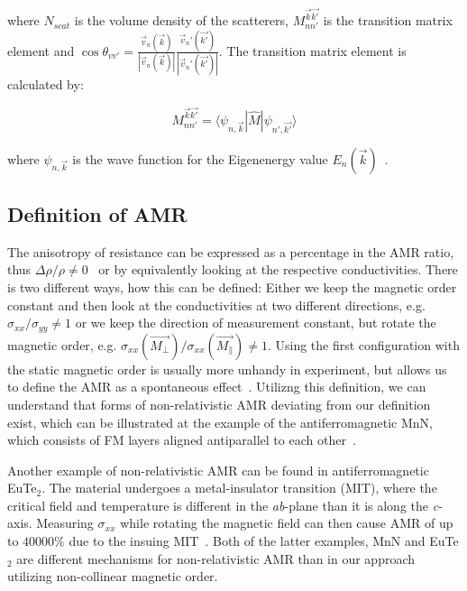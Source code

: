 \documentclass[prb,showpacs,amsmath,amssymb,superscriptaddress,twocolumn,floatfix]{revtex4-1}
\begin{document}
where $N_{scat}$ is the volume density of the scatterers, $M^{\vec{k}\vec{k'}}_{nn'}$ is the transition matrix element and $\cos \theta_{vv'} = \frac{\vec{v}_n (\vec{k})}{|\vec{v}_n (\vec{k})|}\frac{\vec{v}_n' (\vec{k'})}{|\vec{v}_n' (\vec{k'})|}$. The transition matrix element is calculated by:

\begin{equation}
	M^{\vec{k}\vec{k'}}_{nn'} = \langle \psi_{n, \vec{k}}|\hat{M}|\psi_{n', \vec{k'}} \rangle
	\label{eq_transmatrix}
\end{equation}

where $\psi_{n, \vec{k}}$ is the wave function for the Eigenenergy value $E_n(\vec{k})$~\cite{Vyborny:2009}. 

\subsection{Definition of AMR}

The anisotropy of resistance can be expressed as a percentage in the AMR ratio, thus $\Delta \rho / \rho \neq 0$~\cite{Ritzinger:2023} or by equivalently looking at the respective conductivities. There is two different ways, how this can be defined: Either we keep the magnetic order constant and then look at the conductivities at two different directions, e.g. $\sigma_{xx} / \sigma_{yy} \neq 1$ or we keep the direction of measurement constant, but rotate the magnetic order, e.g. $\sigma_{xx} (\vec{M_\perp})  / \sigma_{xx} (\vec{M_\parallel}) \neq 1$. Using the first configuration with the static magnetic order is usually more unhandy in experiment, but allows us to define the AMR as a spontaneous effect~\cite{Bakonyi:2022}. Utilizng this definition, we can understand that forms of non-relativistic AMR deviating from our definition exist, which can be illustrated at the example of the antiferromagnetic MnN, which consists of FM layers aligned antiparallel to each other~\cite{Dunz:2020}.

Another example of non-relativistic AMR can be found in antiferromagnetic EuTe$_2$. The material undergoes a metal-insulator transition (MIT), where the critical field and temperature is different in the \textit{ab}-plane than it is along the \textit{c}-axis. Measuring $\sigma_{xx}$ while rotating the magnetic field can then cause AMR of up to $40000\%$ due to the insuing MIT~\cite{Yang:2021}. Both of the latter examples, MnN and EuTe$_2$ are different mechanisms for non-relativistic AMR than in our approach utilizing non-collinear magnetic order.
\end{document}
